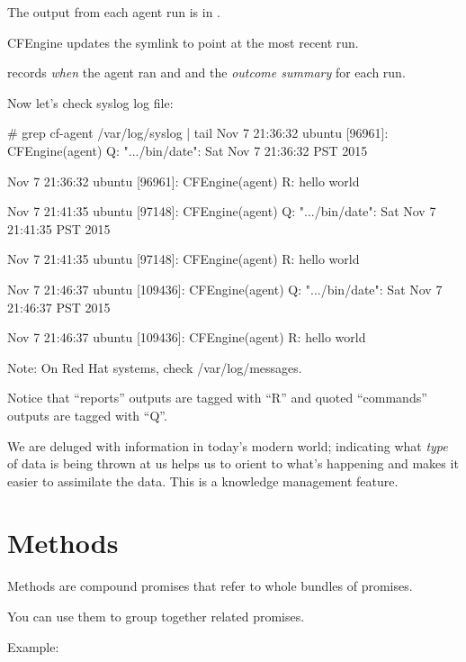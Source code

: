 The output from each agent run is in .

CFEngine updates the  symlink to point at the most recent run.

 records \emph{when} the agent ran and and the \emph{outcome summary} for each run.





Now let's check syslog log file:

\begin{code}
# grep cf-agent /var/log/syslog | tail
Nov  7 21:36:32 ubuntu [96961]: CFEngine(agent) 
  Q: ".../bin/date": Sat Nov  7 21:36:32 PST 2015

Nov  7 21:36:32 ubuntu [96961]: CFEngine(agent) 
  R: hello world

Nov  7 21:41:35 ubuntu [97148]: CFEngine(agent) 
  Q: ".../bin/date": Sat Nov  7 21:41:35 PST 2015

Nov  7 21:41:35 ubuntu [97148]: CFEngine(agent) 
  R: hello world

Nov  7 21:46:37 ubuntu [109436]: CFEngine(agent) 
  Q: ".../bin/date": Sat Nov  7 21:46:37 PST 2015

Nov  7 21:46:37 ubuntu [109436]: CFEngine(agent) 
  R: hello world
\end{code}

Note: On Red Hat systems, check /var/log/messages.





Notice that ``reports'' outputs are tagged with ``R'' and
quoted ``commands'' outputs are tagged with ``Q''.

We are deluged with information in today's modern world; 
indicating what \emph{type} of data is being thrown at us
helps us to orient to what's happening and makes it
easier to assimilate the data.  This is a knowledge
management feature.





\section{Methods}

Methods are compound promises that refer to whole bundles of promises.

You can use them to group together related promises.

Example:

